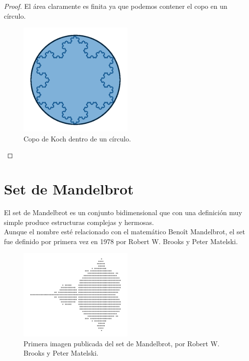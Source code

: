 \begin{proof}
    \noindent El área claramente es finita ya que podemos contener el copo en un círculo.\\
    
    \begin{figure}[H]
        \centering
        \includegraphics[width=0.5\textwidth]{figures/koch-snowflake-circle.png}
        \caption{Copo de Koch dentro de un círculo.}
        \label{fig:koch-snowflake-circle}
    \end{figure}
\end{proof}

\section{Set de Mandelbrot}

\noindent El set de Mandelbrot es un conjunto bidimensional que con una definición muy simple produce estructuras complejas y hermosas.\\

\noindent Aunque el nombre esté relacionado con el matemático Benoît Mandelbrot, el set fue definido por primera vez en 1978 por Robert W. Brooks y Peter Matelski. \cite{Wikipedia_Mandelbrot}

\begin{figure}[H]
    \centering
    \includegraphics[width=0.5\textwidth]{figures/mandelbrot-set-first-picture.png}
    \caption{Primera imagen publicada del set de Mandelbrot, por Robert W. Brooks y Peter Matelski.}
    \label{fig:mandelbrot-set-first-picture}
\end{figure}

